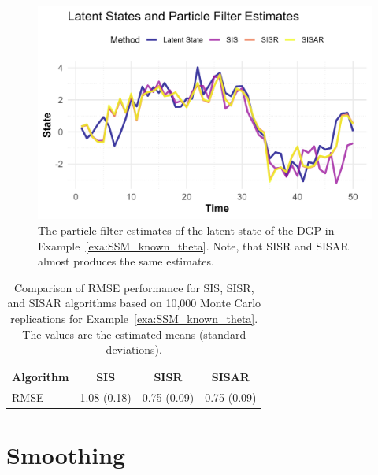 \begin{example}
	\begin{figure}
		\centering
		\includegraphics{example_3.1_estimates.png}
		\caption{The particle filter estimates of the latent state of the \gls*{DGP} in Example~\ref{exa:SSM_known_theta}. Note, that SISR and SISAR almost produces the same estimates.}
		\label{fig:particle_filter_estimates}
	\end{figure}	
	
	\begin{table}
		\centering
		\begin{tabular}{lccc}
			\toprule
			Algorithm & SIS & SISR & SISAR \\
			\midrule
			RMSE      & 1.08 (0.18) & 0.75 (0.09) & 0.75 (0.09) \\
			\bottomrule
		\end{tabular}
		\caption{Comparison of RMSE performance for SIS, SISR, and SISAR algorithms based on 10,000 Monte Carlo replications for Example~\ref{exa:SSM_known_theta}. The values are the estimated means (standard deviations).}
		\label{tab:performance}
	\end{table}
\end{example}

\section{Smoothing}
